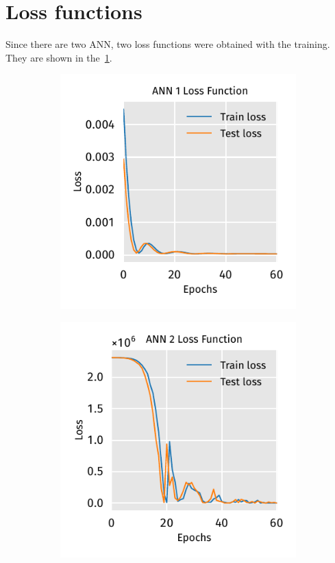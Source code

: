 \section{Loss functions}

Since there are two ANN, two loss functions were obtained with the training. They are shown in the~\cref{fig:test_loss}.

\begin{figure}[!htb]
    \centering
    \caption[Loss Functions Behavior]{Loss Functions Behavior. The total number of epochs is 500 and was omitted because they were approximating a straight line.}
    \begin{subfigure}{0.49\textwidth}
        \centering
        \includegraphics{../codes/figures/ann1_loss_function.pdf}
    \end{subfigure}
    \hfill
    \begin{subfigure}{0.49\textwidth}
        \centering
        \includegraphics{../codes/figures/ann2_loss_function.pdf}
    \end{subfigure}

    \label{fig:test_loss}
\end{figure}

